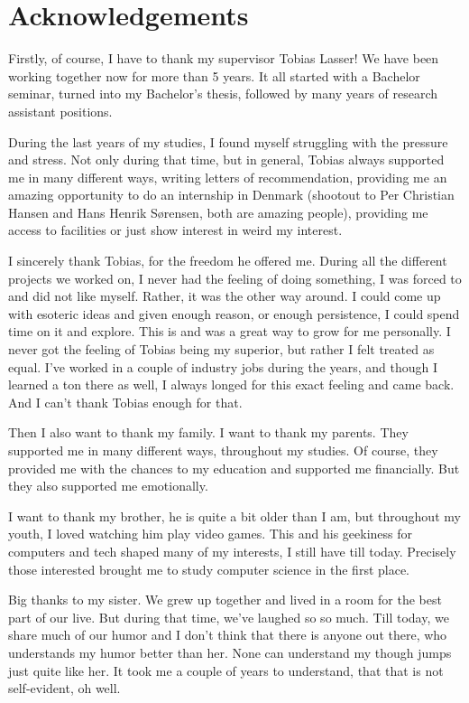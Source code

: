 \thispagestyle{empty}
\chapter*{Acknowledgements}
\noindent%

Firstly, of course, I have to thank my supervisor Tobias Lasser! We have been working together now
for more than 5 years. It all started with a Bachelor seminar, turned into my Bachelor's thesis,
followed by many years of research assistant positions.

During the last years of my studies, I found myself struggling with the pressure and stress. Not
only during that time, but in general, Tobias always supported me in many different ways, writing
letters of recommendation, providing me an amazing opportunity to do an internship in Denmark
(shootout to Per Christian Hansen and Hans Henrik Sørensen, both are amazing people), providing me
access to facilities or just show interest in weird my interest.

I sincerely thank Tobias, for the freedom he offered me. During all the different projects we worked
on, I never had the feeling of doing something, I was forced to and did not like myself. Rather, it
was the other way around. I could come up with esoteric ideas and given enough reason, or enough
persistence, I could spend time on it and explore. This is and was a great way to grow for me
personally. I never got the feeling of Tobias being my superior, but rather I felt treated as equal.
I've worked in a couple of industry jobs during the years, and though I learned a ton there as well,
I always longed for this exact feeling and came back. And I can't thank Tobias enough for that.

Then I also want to thank my family. I want to thank my parents. They supported me in many different
ways, throughout my studies. Of course, they provided me with the chances to my education and
supported me financially. But they also supported me emotionally.

I want to thank my brother, he is quite a bit older than I am, but throughout my youth, I loved
watching him play video games. This and his geekiness for computers and tech shaped many of my
interests, I still have till today. Precisely those interested brought me to study computer science
in the first place.

Big thanks to my sister. We grew up together and lived in a room for the best part of our live. But
during that time, we've laughed so so much. Till today, we share much of our humor and I don't think
that there is anyone out there, who understands my humor better than her. None can understand my
though jumps just quite like her. It took me a couple of years to understand, that that is not
self-evident, oh well.


